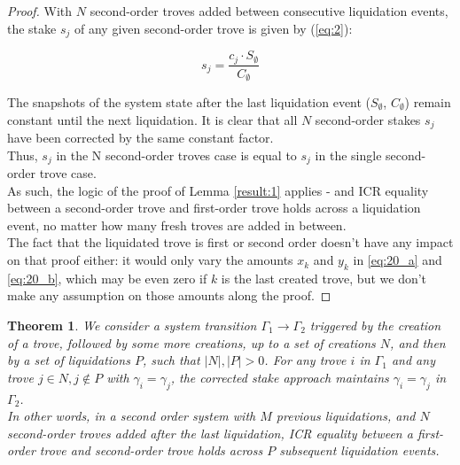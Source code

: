 \documentclass[reqno]{article}
\newtheorem{theorem}{Theorem}[section]
\begin{document}
\begin{proof}
With $N$ second-order troves added between consecutive liquidation events, the stake $s_j$ of any given second-order trove is given by (\ref{eq:2}):

\begin{equation} 
    s_j=\frac{c_j \cdot S_\emptyset}{C_\emptyset}
\end{equation}

\bigskip
The snapshots of the system state after the last liquidation event ($S_\emptyset$, $C_\emptyset$) remain constant until the next liquidation. It is clear that all $N$ second-order stakes $s_j$ have been corrected by the same constant factor.\\

Thus, $s_j$ in the N second-order troves case is equal to $s_j$ in the single second-order trove case.\\

As such, the logic of the proof of Lemma \ref{result:1} applies - and ICR equality between a second-order trove and first-order trove holds across a liquidation event, no matter how many fresh troves are added in between.\\
The fact that the liquidated trove is first or second order doesn’t have any impact on that proof either: it would only vary the amounts $x_k$ and $y_k$ in \ref{eq:20_a} and \ref{eq:20_b}, which may be even zero if $k$ is the last created trove, but we don’t make any assumption on those amounts along the proof.
\end{proof}

\begin{theorem} \label{result:4}
We consider a system transition $\Gamma_1 \rightarrow \Gamma_2$ triggered by the creation of a trove, followed by some more creations, up to a set of creations $N$, and then by a set of liquidations $P$, such that $|N|, |P| > 0$. For any trove $i$ in $\Gamma_1$ and any trove $j \in N, j\notin P$ with $\gamma_i = \gamma_j$, the corrected stake approach maintains $\gamma_i = \gamma_j$ in $\Gamma_2$. \\
In other words, in a second order system with $M$ previous liquidations, and $N$ second-order troves added after the last liquidation, ICR equality between a first-order trove and second-order trove holds across $P$ subsequent liquidation events.
\end{theorem}
\end{document}
